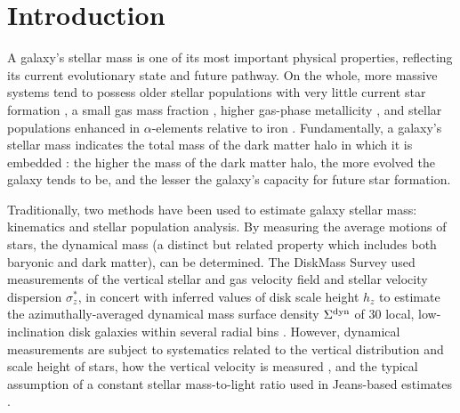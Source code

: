 \section{Introduction}
\label{chap1:sec:intro}

A galaxy's stellar mass is one of its most important physical properties, reflecting its current evolutionary state and future pathway. On the whole, more massive systems tend to possess older stellar populations \citep{gallazzi_charlot_05, gallazzi_06} with very little current star formation \citep{kauffmann_heckman_white_03, balogh_04_cmd, baldry_06_massquenching}, a small gas mass fraction \citep{mcgaugh_de-blok_97}, higher gas-phase metallicity \citep{tremonti_mz}, and stellar populations enhanced in $\alpha$-elements relative to iron \citep{thomas_maraston_korn_04, thomas_05}. Fundamentally, a galaxy's stellar mass indicates the total mass of the dark matter halo in which it is embedded \citep{yang_03_smhmr, behroozi_wechsler_conroy_13, somerville_behroozi_2018}: the higher the mass of the dark matter halo, the more evolved the galaxy tends to be, and the lesser the galaxy's capacity for future star formation.

Traditionally, two methods have been used to estimate galaxy stellar mass: kinematics and stellar population analysis. By measuring the average motions of stars, the dynamical mass (a distinct but related property which includes both baryonic and dark matter), can be determined. The DiskMass Survey \citep[DMS,][]{diskmass_i} used measurements of the vertical stellar and gas velocity field and stellar velocity dispersion $\sigma^*_z$, in concert with inferred values of disk scale height $h_z$ to estimate the azimuthally-averaged dynamical mass surface density $\Sigma^{\rm dyn}$ of 30 local, low-inclination disk galaxies within several radial bins \citep{diskmass_vii}. However, dynamical measurements are subject to systematics related to the vertical distribution and scale height of stars, how the vertical velocity is measured \citep{aniyan_freeman_16, aniyan_freeman_18}, and the typical assumption of a constant stellar mass-to-light ratio used in Jeans-based estimates \citep{bernardi_sheth_17}.

